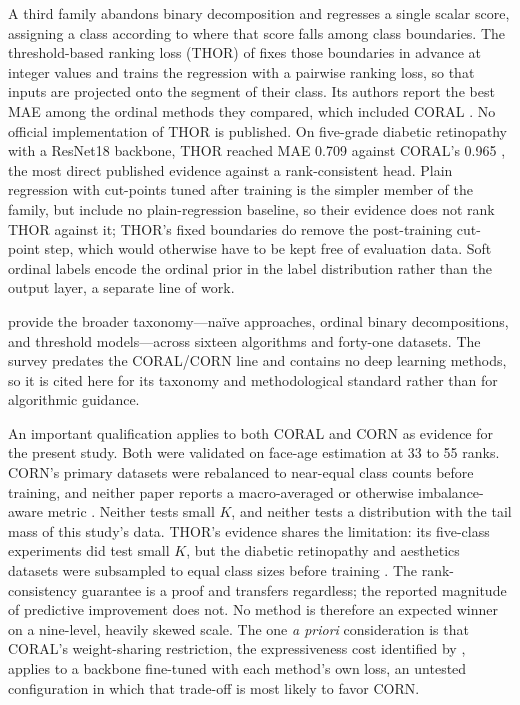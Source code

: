 \documentclass{icsthesis}
\begin{document}
\begin{mainmatter}
				A third family abandons binary decomposition and regresses a single scalar score,
				assigning a class according to where that score falls among class boundaries. The
				threshold-based ranking loss (THOR) of \citet{fuchs2022} fixes those boundaries in
				advance at integer values and trains the regression with a pairwise ranking loss, so
				that inputs are projected onto the segment of their class. Its authors report the
				best MAE among the ordinal methods they compared, which included CORAL
				\citep{fuchs2022}. No official implementation of THOR is published. On five-grade diabetic retinopathy with a ResNet18 backbone, THOR reached MAE 0.709 against CORAL's 0.965 \citep{fuchs2022}, the most direct published evidence against a rank-consistent head. Plain regression with cut-points tuned after training is the simpler member of the family, but \citet{fuchs2022} include no plain-regression baseline, so their evidence does not rank THOR against it; THOR's fixed boundaries do remove the post-training cut-point step, which would otherwise have to be kept free of evaluation data. Soft ordinal labels \citep{diaz2019} encode the ordinal prior in the label distribution rather than the output layer, a separate line of work.

				\citet{gutierrez2016} provide the broader taxonomy---na\"ive approaches, ordinal
				binary decompositions, and threshold models---across sixteen algorithms and
				forty-one datasets. The survey predates the CORAL/CORN line and contains no deep
				learning methods, so it is cited here for its taxonomy and methodological standard
				rather than for algorithmic guidance.

				An important qualification applies to both CORAL and CORN as evidence for the
				present study. Both were validated on face-age estimation at 33 to 55 ranks. CORN's
				primary datasets were rebalanced to near-equal class counts before training, and
				neither paper reports a macro-averaged or otherwise imbalance-aware metric
				\citep{cao2020,shi2023corn}. Neither tests small $K$, and neither tests a
				distribution with the tail mass of this study's data. THOR's evidence shares the
				limitation: its five-class experiments did test small $K$, but the diabetic
				retinopathy and aesthetics datasets were subsampled to equal class sizes before
				training \citep{fuchs2022}. The rank-consistency guarantee is a proof and transfers
				regardless; the reported magnitude of predictive improvement does not. No method is therefore an expected winner on a nine-level, heavily skewed scale. The one \textit{a priori} consideration is that CORAL's weight-sharing restriction, the expressiveness cost identified by \citet{shi2023corn}, applies to a backbone fine-tuned with each method's own loss, an untested configuration in which that trade-off is most likely to favor CORN.


\end{mainmatter}
\end{document}
